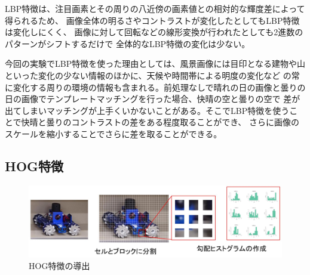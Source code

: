 \documentclass[titlepage,dvipdfmx]{jsarticle}
\begin{document}
LBP特徴は、注目画素とその周りの八近傍の画素値との相対的な輝度差によって得られるため、
画像全体の明るさやコントラストが変化したとしてもLBP特徴は変化しにくく、
画像に対して回転などの線形変換が行われたとしても2進数のパターンがシフトするだけで
全体的なLBP特徴の変化は少ない。

今回の実験でLBP特徴を使った理由としては、風景画像には目印となる建物や山といった変化の少ない情報のほかに、天候や時間帯による明度の変化など
の常に変化する周りの環境の情報も含まれる。前処理なしで晴れの日の画像と曇りの日の画像でテンプレートマッチングを行った場合、快晴の空と曇りの空で
差が出てしまいマッチングが上手くいかないことがある。そこでLBP特徴を使うことで快晴と曇りのコントラストの差をある程度取ることができ、
さらに画像のスケールを縮小することでさらに差を取ることができる。\subsection{HOG特徴}
\begin{figure}[t]
  \centering
  \includegraphics[pagebox=cropbox, scale=0.2]{HOG.jpg}
  \caption{HOG特徴の導出}
  \label{HOG}
\end{figure}
\end{document}
